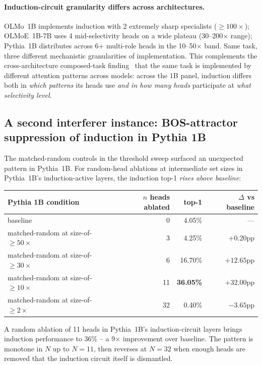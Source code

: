 \documentclass[11pt]{article}
\begin{document}
\paragraph{Induction-circuit granularity differs across architectures.} OLMo~1B implements induction with 2 extremely sharp specialists ($\geq 100\times$); OLMoE~1B-7B uses 4 mid-selectivity heads on a wide plateau (30--200$\times$ range); Pythia~1B distributes across 6+ multi-role heads in the 10--50$\times$ band. Same task, three different mechanistic granularities of implementation. This complements the cross-architecture composed-task finding~\citep{paper3_circuits} that the same task is implemented by different attention patterns across models: across the 1B panel, induction differs both in \emph{which patterns} its heads use \emph{and in how many heads} participate at \emph{what selectivity level}.

\subsection{A second interferer instance: BOS-attractor suppression of induction in Pythia 1B}
\label{sec:bos_suppression}

The matched-random controls in the threshold sweep surfaced an unexpected pattern in Pythia~1B. For random-head ablations at intermediate set sizes in Pythia~1B's induction-active layers, the induction top-1 \emph{rises above baseline}:

\begin{center}
\footnotesize
\begin{tabular}{lrrr}
\toprule
Pythia 1B condition & $n$ heads ablated & top-1 & $\Delta$ vs baseline \\
\midrule
baseline                              & 0  & 4.05\%       & --- \\
matched-random at size-of-$\geq 50\times$  & 3  & 4.25\%       & $+0.20$pp \\
matched-random at size-of-$\geq 30\times$  & 6  & 16.70\%      & $\mathbf{+12.65}$pp \\
matched-random at size-of-$\geq 10\times$  & 11 & \textbf{36.05\%} & $\mathbf{+32.00}$pp \\
matched-random at size-of-$\geq 2\times$   & 32 & 0.40\%       & $-3.65$pp \\
\bottomrule
\end{tabular}
\end{center}

A random ablation of 11 heads in Pythia~1B's induction-circuit layers brings induction performance to 36\% -- a 9$\times$ improvement over baseline. The pattern is monotone in $N$ up to $N=11$, then reverses at $N=32$ when enough heads are removed that the induction circuit itself is dismantled.
\end{document}
